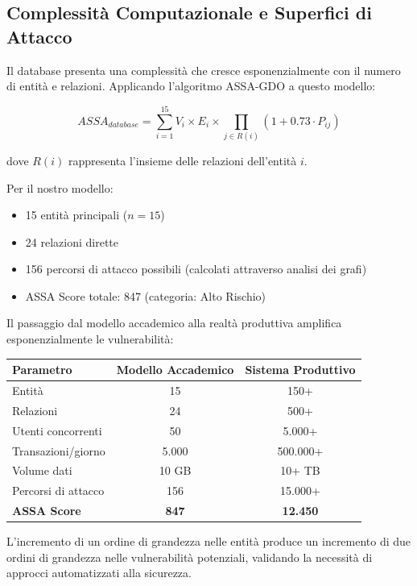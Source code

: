 \subsection{Complessità Computazionale e Superfici di Attacco}
\label{subsec:complessita_computazionale}

Il database presenta una complessità che cresce esponenzialmente con il numero di entità e relazioni. Applicando l'algoritmo ASSA-GDO a questo modello:

$$ASSA_{database} = \sum_{i=1}^{15} V_i \times E_i \times \prod_{j \in R(i)} (1 + 0.73 \cdot P_{ij})$$

dove $R(i)$ rappresenta l'insieme delle relazioni dell'entità $i$.

Per il nostro modello:
\begin{itemize}
\item 15 entità principali ($n = 15$)
\item 24 relazioni dirette
\item 156 percorsi di attacco possibili (calcolati attraverso analisi dei grafi)
\item ASSA Score totale: 847 (categoria: Alto Rischio)
\end{itemize}

\begin{tcolorbox}[
    colback=yellow!5!white,
    colframe=yellow!75!black,
    title={\textbf{Insight Operativo:} Scalabilità delle Minacce},
    fonttitle=\bfseries,
    boxrule=1.5pt,
    arc=2mm
]
Il passaggio dal modello accademico alla realtà produttiva amplifica esponenzialmente le vulnerabilità:

\begin{center}
\begin{tabular}{lcc}
\toprule
\textbf{Parametro} & \textbf{Modello Accademico} & \textbf{Sistema Produttivo} \\
\midrule
Entità & 15 & 150+ \\
Relazioni & 24 & 500+ \\
Utenti concorrenti & 50 & 5.000+ \\
Transazioni/giorno & 5.000 & 500.000+ \\
Volume dati & 10 GB & 10+ TB \\
Percorsi di attacco & 156 & 15.000+ \\
\textbf{ASSA Score} & \textbf{847} & \textbf{12.450} \\
\bottomrule
\end{tabular}
\end{center}

L'incremento di un ordine di grandezza nelle entità produce un incremento di due ordini di grandezza nelle vulnerabilità potenziali, validando la necessità di approcci automatizzati alla sicurezza.
\end{tcolorbox}

